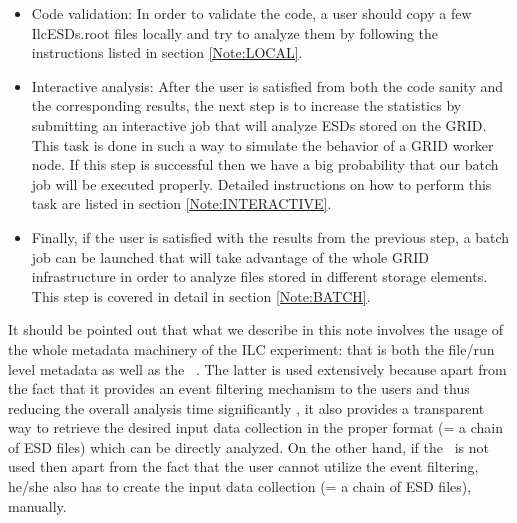 \begin{itemize}
\item Code validation: In order to validate the code, a user should
  copy a few IlcESDs.root files locally and try to analyze them by
  following the instructions listed in section \ref{Note:LOCAL}.

\item Interactive analysis: After the user is satisfied from both the
  code sanity and the corresponding results, the next step is to
  increase the statistics by submitting an interactive job that will
  analyze ESDs stored on the GRID. This task is done in such a way to
  simulate the behavior of a GRID worker node. If this step is
  successful then we have a big probability that our batch job will be
  executed properly. Detailed instructions on how to perform this task
  are listed in section \ref{Note:INTERACTIVE}.

\item Finally, if the user is satisfied with the results from the
  previous step, a batch job can be launched that will take advantage
  of the whole GRID infrastructure in order to analyze files stored in
  different storage elements. This step is covered in detail in
  section \ref{Note:BATCH}.

\end{itemize}

It should be pointed out that what we describe in this note involves
the usage of the whole metadata machinery of the ILC experiment:
that is both the file/run level metadata
\cite{Note:RefFileCatalogMetadataNote} as well as the \tag\
\cite{Note:RefEventTagNote}. The latter is used extensively because
apart from the fact that it provides an event filtering mechanism to
the users and thus reducing the overall analysis time significantly
\cite{Note:RefEventTagNote}, it also provides a transparent way to
retrieve the desired input data collection in the proper format (= a
chain of ESD files) which can be directly analyzed. On the other hand,
if the \tag\ is not used then apart from the fact that the user cannot
utilize the event filtering, he/she also has to create the input data
collection (= a chain of ESD files), manually.


